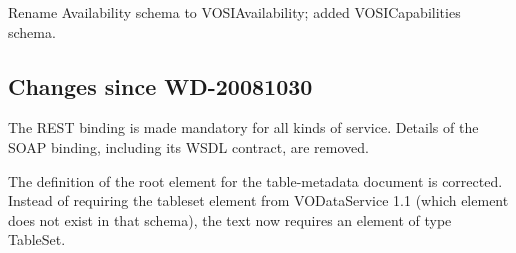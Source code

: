 \documentclass[11pt,letter]{ivoa}
\begin{document}
Rename Availability schema to VOSIAvailability; added VOSICapabilities schema.

\subsection{Changes since WD-20081030}

The REST binding is made mandatory for all kinds of service. Details of the SOAP binding, including its WSDL contract, are removed.

The definition of the root element for the table-metadata document is corrected. Instead of requiring the tableset element from VODataService 1.1 (which element does not exist in that schema), the text now requires an element of type TableSet. 



\end{document}
